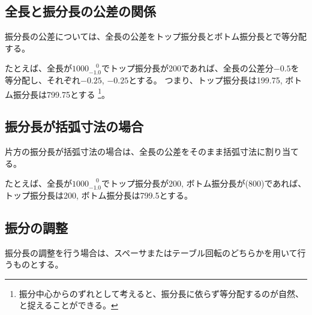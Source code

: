 \subsection{全長と振分長の公差の関係}
振分長の公差については、全長の公差をトップ振分長とボトム振分長とで等分配する。

たとえば、全長が$1000^{\phantom +0}_{-1.0}$でトップ振分長が200であれば、全長の公差分$-0.5$を等分配し、それぞれ$-0.25$, $-0.25$とする。
つまり、トップ振分長は199.75, ボトム振分長は799.75とする
\footnote{振分中心からのずれとして考えると、振分長に依らず等分配するのが自然、と捉えることができる。}。


\subsection{振分長が括弧寸法の場合}
片方の振分長が括弧寸法の場合は、全長の公差をそのまま括弧寸法に割り当てる。

たとえば、全長が$1000^{\phantom +0}_{-1.0}$でトップ振分長が200, ボトム振分長が(800)であれば、トップ振分長は200, ボトム振分長は799.5とする。


\subsection{振分の調整}
振分長の調整を行う場合は、スペーサまたはテーブル回転のどちらかを用いて行うものとする。


